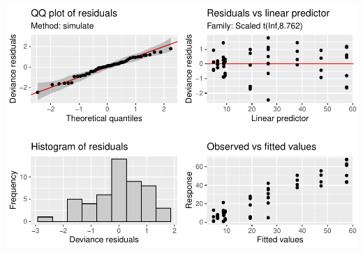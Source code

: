 \documentclass[
]{article}
\begin{document}
\includegraphics{Full_document_files/figure-latex/missing-data-Appendix-1}
\end{document}
